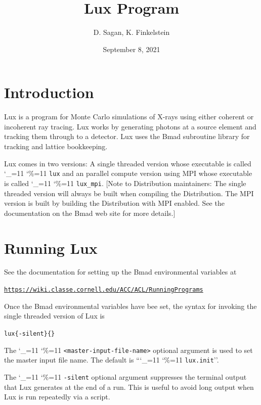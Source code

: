 \documentclass[11pt]{article}
\title{Lux Program}
\author{D. Sagan, K. Finkelstein}
\date{September 8, 2021}
\newcommand{\lux}{Lux\xspace}
\newcommand\ttcmd{\begingroup\catcode`\_=11 \catcode`\%=11 \dottcmd}
\newcommand\dottcmd[1]{\texttt{#1}\endgroup}
\newcommand{\vn}{\ttcmd}
\newenvironment{example}
  {\vspace{\ExBeg} \begin{alltt}}
  {\end{alltt} \vspace{\ExEnd}}
\newlength{\ExBeg}
\newlength{\ExEnd}
\begin{document}
\maketitle

\tableofcontents

\section{Introduction} 
\label{s:intro}

\lux is a program for Monte Carlo simulations of X-rays using either coherent or incoherent ray
tracing. \lux works by generating photons at a source element and tracking them through to a
detector. \lux uses the Bmad subroutine library\cite{b:bmad} for tracking and lattice bookkeeping.

\lux comes in two versions: A single threaded version whose executable is called \vn{lux} and an
parallel compute version using MPI whose executable is called \vn{lux_mpi}. [Note to Distribution
maintainers: The single threaded version will always be built when compiling the Distribution. The
MPI version is built by building the Distribution with MPI enabled. See the documentation on the Bmad
web site for more details.]

\section{Running \lux} 
\label{s:run}

See the documentation for setting up the Bmad environmental variables at
\begin{example}
  \url{https://wiki.classe.cornell.edu/ACC/ACL/RunningPrograms}
\end{example}

Once the Bmad environmental variables have bee set, the syntax for invoking the single threaded
version of \lux is
\begin{example}
  lux \{-silent\} \{<master-input-file-name>\}
\end{example}
The \vn{<master-input-file-name>} optional argument is used to set the master input file name. The
default is ``\vn{lux.init}''.

The \vn{-silent} optional argument suppresses the terminal output that \lux generates at the end of
a run. This is useful to avoid long output when \lux is run repeatedly via a script.
\end{document}
